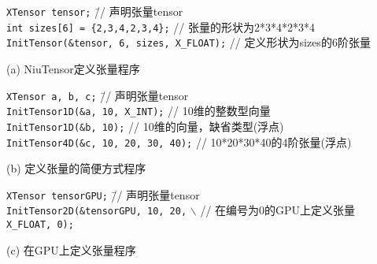 \begin{tcolorbox}[enhanced,width=12cm,frame engine=empty,boxrule=0.1mm,size=title,colback=blue!10!white]
\begin{flushleft}
{\scriptsize
\begin{tabbing}
\texttt{XTensor tensor;} \hspace{14em} \= // 声明张量tensor \\
\texttt{int sizes[6] = \{2,3,4,2,3,4\};} \> // 张量的形状为2*3*4*2*3*4 \\
\texttt{InitTensor(\&tensor, 6, sizes, X\_FLOAT);} \> // 定义形状为sizes的6阶张量
\end{tabbing}
}
\end{flushleft}
\end{tcolorbox}
\hspace{0.1in} \scriptsize{(a) NiuTensor定义张量程序}
\\
\begin{tcolorbox}[enhanced,width=12cm,frame engine=empty,boxrule=0.1mm,size=title,colback=blue!10!white]
\begin{flushleft}
{\scriptsize
\begin{tabbing}
\texttt{XTensor a, b, c;} \hspace{13.5em} \= // 声明张量tensor \\
\texttt{InitTensor1D(\&a, 10, X\_INT);} \> // 10维的整数型向量\\
\texttt{InitTensor1D(\&b, 10);} \> // 10维的向量，缺省类型(浮点)\\
\texttt{InitTensor4D(\&c, 10, 20, 30, 40);} \> // 10*20*30*40的4阶张量(浮点)
\end{tabbing}
}
\end{flushleft}
\end{tcolorbox}
\hspace{0.1in} \scriptsize{(b) 定义张量的简便方式程序}
\\
\begin{tcolorbox}[enhanced,width=12cm,frame engine=empty,boxrule=0.1mm,size=title,colback=blue!10!white]
\begin{flushleft}
{\scriptsize
\begin{tabbing}
\texttt{XTensor tensorGPU;} \hspace{12.5em} \= // 声明张量tensor \\
\texttt{InitTensor2D(\&tensorGPU, 10, 20,} $\backslash$ \> // 在编号为0的GPU上定义张量 \\
\hspace{6.7em} \texttt{X\_FLOAT, 0);}
\end{tabbing}
}
\end{flushleft}
\end{tcolorbox}
\hspace{0.1in} \scriptsize{(c) 在GPU上定义张量程序}

